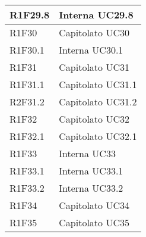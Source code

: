 \begin{center}
\begin{longtable}{|p{22mm}|p{44mm}|}
R1F29.8 &
Interna \newline
UC29.8 \newline
\\
\hline

R1F30 &
Capitolato \newline
UC30 \newline
\\
\hline

R1F30.1 &
Interna \newline
UC30.1 \newline
\\
\hline

R1F31 &
Capitolato \newline
UC31 \newline
\\
\hline

R1F31.1 &
Capitolato \newline
UC31.1 \newline
\\
\hline

R2F31.2 &
Capitolato \newline
UC31.2 \newline
\\
\hline

R1F32 &
Capitolato \newline
UC32 \newline
\\
\hline

R1F32.1 &
Capitolato \newline
UC32.1 \newline
\\
\hline

R1F33 &
Interna \newline
UC33 \newline
\\
\hline

R1F33.1 &
Interna \newline
UC33.1 \newline
\\
\hline

R1F33.2 &
Interna \newline
UC33.2 \newline
\\
\hline

R1F34 &
Capitolato \newline
UC34 \newline
\\
\hline

R1F35 &
Capitolato \newline
UC35 \newline
\\
\hline


\end{longtable}
\end{center}
